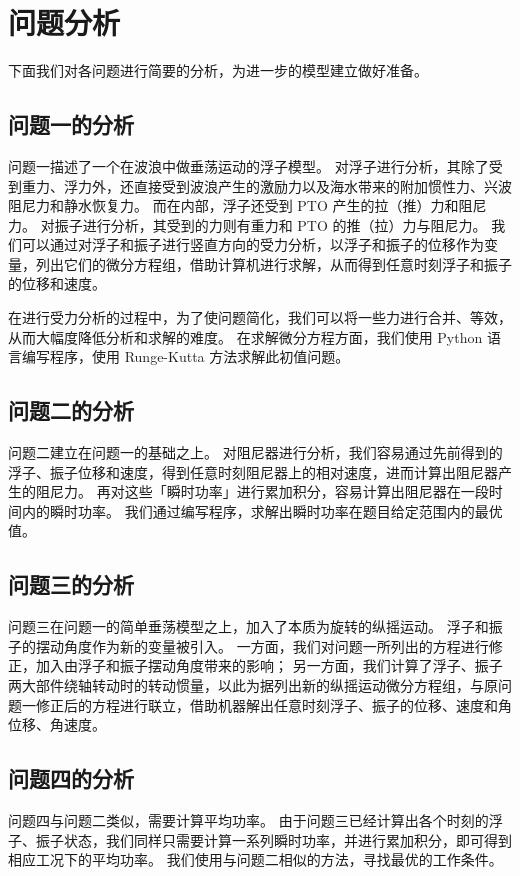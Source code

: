 \section{问题分析}

下面我们对各问题进行简要的分析，为进一步的模型建立做好准备。

\subsection{问题一的分析}

问题一描述了一个在波浪中做垂荡运动的浮子模型。
对浮子进行分析，其除了受到重力、浮力外，还直接受到波浪产生的激励力以及海水带来的附加惯性力、兴波阻尼力和静水恢复力。
而在内部，浮子还受到 PTO 产生的拉（推）力和阻尼力。
对振子进行分析，其受到的力则有重力和 PTO 的推（拉）力与阻尼力。
我们可以通过对浮子和振子进行竖直方向的受力分析，以浮子和振子的位移作为变量，列出它们的微分方程组，借助计算机进行求解，从而得到任意时刻浮子和振子的位移和速度。

在进行受力分析的过程中，为了使问题简化，我们可以将一些力进行合并、等效，从而大幅度降低分析和求解的难度。
在求解微分方程方面，我们使用 Python 语言编写程序，使用 Runge-Kutta 方法求解此初值问题。

\subsection{问题二的分析}

问题二建立在问题一的基础之上。
对阻尼器进行分析，我们容易通过先前得到的浮子、振子位移和速度，得到任意时刻阻尼器上的相对速度，进而计算出阻尼器产生的阻尼力。
再对这些「瞬时功率」进行累加积分，容易计算出阻尼器在一段时间内的瞬时功率。
我们通过编写程序，求解出瞬时功率在题目给定范围内的最优值。

\subsection{问题三的分析}

问题三在问题一的简单垂荡模型之上，加入了本质为旋转的纵摇运动。
浮子和振子的摆动角度作为新的变量被引入。
一方面，我们对问题一所列出的方程进行修正，加入由浮子和振子摆动角度带来的影响；
另一方面，我们计算了浮子、振子两大部件绕轴转动时的转动惯量，以此为据列出新的纵摇运动微分方程组，与原问题一修正后的方程进行联立，借助机器解出任意时刻浮子、振子的位移、速度和角位移、角速度。

\subsection{问题四的分析}

问题四与问题二类似，需要计算平均功率。
由于问题三已经计算出各个时刻的浮子、振子状态，我们同样只需要计算一系列瞬时功率，并进行累加积分，即可得到相应工况下的平均功率。
我们使用与问题二相似的方法，寻找最优的工作条件。